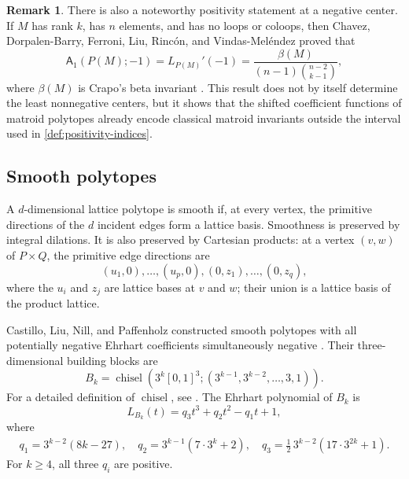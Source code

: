 \documentclass[reqno, 12pt]{article}
\numberwithin{equation}{section}
\theoremstyle{definition}
\newtheorem{remark}[theorem]{Remark}
\newcommand{\A}{\mathsf{A}}
\begin{document}
\begin{remark}
There is also a noteworthy positivity statement at a negative center.
If $M$ has rank $k$, has $n$ elements, and has no loops or coloops, then
Chavez, Dorpalen-Barry, Ferroni, Liu, Rinc\'on, and Vindas-Mel\'endez
proved \cite[Theorem~1.1]{ChavezEtAl2026} that
\[\A_1(P(M);-1)=L_{P(M)}'(-1)=\frac{\beta(M)}{(n-1)\binom{n-2}{k-1}},
\]
where $\beta(M)$ is Crapo's beta invariant \cite{Crapo1967}. This result does not by
itself determine the least nonnegative centers, but it shows that the
shifted coefficient functions of matroid polytopes already encode
classical matroid invariants outside the interval used in
\cref{def:positivity-indices}.
\end{remark}

\subsection{Smooth polytopes}

A $d$-dimensional lattice polytope is smooth if, at every vertex, the
primitive directions of the $d$ incident edges form a lattice basis.
Smoothness is preserved by integral dilations.  It is also preserved by
Cartesian products: at a vertex $(v,w)$ of $P\times Q$, the primitive
edge directions are
\[
 (u_1,0),\ldots,(u_p,0),(0,z_1),\ldots,(0,z_q),
\]
where the $u_i$ and $z_j$ are lattice bases at $v$ and $w$; their union
is a lattice basis of the product lattice.

Castillo, Liu, Nill, and Paffenholz constructed smooth polytopes with all potentially negative Ehrhart coefficients simultaneously negative \cite{CastilloEtAl2018}.  Their three-dimensional building blocks are
\[
 B_k=\operatorname{chisel}\!
 \left(3^k[0,1]^3;(3^{k-1},3^{k-2},\ldots,3,1)\right).
\]
For a detailed definition of $\operatorname{chisel}$, see \cite{CastilloEtAl2018}.
The Ehrhart polynomial of $B_k$ is 
\begin{equation*}
 L_{B_k}(t)=q_3t^3+q_2t^2-q_1t+1,
\end{equation*}
where
\begin{align*}
 q_1=3^{k-2}(8k-27),\quad
 q_2=3^{k-1}(7\cdot3^k+2),\quad
 q_3=\frac12\,3^{k-2}(17\cdot3^{2k}+1).
\end{align*}
For $k\geq4$, all three $q_i$ are positive.
\end{document}
